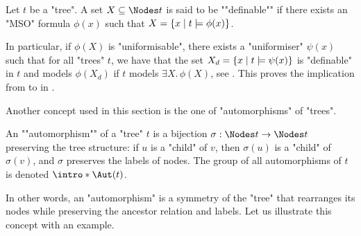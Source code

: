 \documentclass[a4paper,UKenglish,cleveref, autoref, thm-restate]{lipics-v2021}
\begin{document}
\begin{definition}\label{def:definable}
	\AP Let $t$ be a "tree". A set $X \subseteq \Nodes t$ is said to be ""definable"" if there exists an
	"MSO" formula $\phi(x)$ such that $X = \left\{x \mid t \models \phi(x)\right\}$.
\end{definition}

In particular, if $\phi(X)$ is "uniformisable", there exists a "uniformiser" $\psi(x)$ such that for all "trees" $t$,
we have that the set $X_d = \left\{x \mid t \models \psi(x)\right\}$ is "definable" in $t$ and models $\phi(X_d)$ if $t$ models $\exists X.\, \phi(X)$,
see .
This proves the implication from  to  in .

Another concept used in this section is the one of "automorphisms" of "trees".
\begin{definition}["automorphism"]\label{def:automorphism}
	\AP An ""automorphism"" of a "tree" $t$ is a bijection $\sigma : \Nodes t \to \Nodes t$ preserving the tree structure:
	if $u$ is a "child" of $v$, then $\sigma(u)$ is a "child" of $\sigma(v)$, and $\sigma$ preserves the labels of nodes.
	The group of all automorphisms of $t$ is denoted $\intro* \Aut(t)$.
\end{definition}

In other words, an "automorphism" is a symmetry of the "tree" that rearranges its nodes while preserving the ancestor relation and labels.
Let us illustrate this concept with an example.
\end{document}
